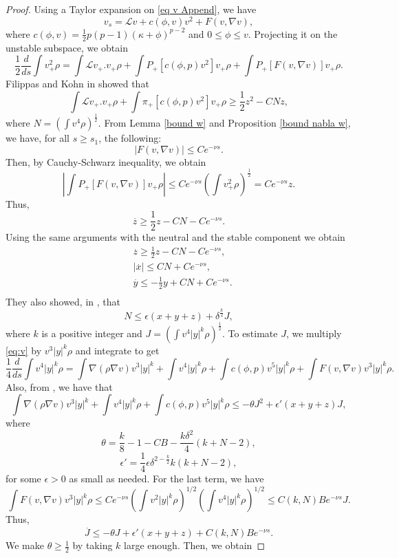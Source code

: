 \documentclass[11pt,a4paper]{article}
\newcommand{\1}{\mathbbm{1}}
\numberwithin{equation}{section}
\theoremstyle{remark}
\begin{document}
\begin{proof}
Using a Taylor expansion on \eqref{eq v Append}, we have
\begin{equation}\label{eq:v}
v_s=\mathcal{L}v+c(\phi,v)v^2+F(v,\nabla v),
\end{equation}
where $c(\phi,v)=\frac{1}{2}p(p-1)(\kappa+\phi)^{p-2}$ and $0\leq \phi \leq v$. 
Projecting it on the unstable subspace, we obtain 
$$\frac{1}{2}\frac{d}{d s}\int v^2_+\rho=\int \mathcal{L}v_+ .v_+\rho+\int P_+[c(\phi,p)v^2]v_+\rho+\int P_+[F(v,\nabla v)]v_+\rho.$$
Filippas and Kohn in \cite[pages 842 and 843]{FK1992} showed that 
$$\int \mathcal{L}v_+ .v_+\rho+\int \pi_+[c(\phi,p)v^2]v_+\rho\geq \frac{1}{2}z^2-CNz,$$
where $N=(\int v^4\rho)^{\frac{1}{2}}$. From Lemma \ref{bound w} and Proposition \ref{bound nabla w}, we have, for all $s\geq s_1$, the following:
$$|F(v,\nabla v)|\leq Ce^{-\nu s}.$$
Then, by Cauchy-Schwarz inequality, we obtain 
$$\left|\int P_+[F(v,\nabla v)]v_+\rho\right|\leq Ce^{-\nu s}\left(\int v_+^2\rho\right)^{\frac{1}{2}}=Ce^{-\nu s} z.$$
Thus,
$$\overset{.}{z}\geq \frac{1}{2}z-CN-Ce^{-\nu s}.$$
Using the same arguments with the neutral and the stable component we obtain 
\begin{equation}\label{ineq xyz}
\begin{split}
&\overset{.}{z}\geq \frac{1}{2}z-CN-Ce^{-\nu s},\\
&|\overset{.}{x}|\leq CN+Ce^{-\nu s},\\
&\overset{.}{y}\leq -\frac{1}{2}y+CN+Ce^{-\nu s}.\\
\end{split}
\end{equation}
They also showed, in \cite[(4.10)]{FK1992}, that 
\begin{equation}\label{Control N}
N\leq \epsilon (x+y+z)+\delta^{\frac{k}{2}} J,
\end{equation}
where $k$ is a positive integer and $J=(\int v^4 |y|^k\rho )^{\frac{1}{2}}$.
To estimate $J$, we multiply \eqref{eq:v} by $v^3|y|^k\rho$ and integrate to get
\begin{equation}
\frac{1}{4}\frac{d}{ds}\int v^4|y|^k\rho=\int \nabla(\rho\nabla v)v^3|y|^k+\int v^4|y|^k\rho +\int c(\phi,p)v^5|y|^k \rho+\int F(v,\nabla v)v^3|y|^k\rho.
\end{equation}
Also, from \cite[(4.15)]{FK1992}, we have that
$$\int \nabla(\rho\nabla v)v^3|y|^k+\int v^4|y|^k\rho +\int c(\phi,p)v^5|y|^k \rho\leq -\theta J^2+\epsilon '(x+y+z)J,$$
where 
$$\theta =\frac{k}{8}-1-CB-\frac{k\delta^2}{4}(k+N-2),$$
$$\epsilon '=\frac{1}{4}\epsilon \delta^{2-\frac{k}{2}}k(k+N-2),$$
 for some $\epsilon>0$ as small as needed. For the last term, we have 
$$\int F(v,\nabla v)v^3 |y|^k\rho\leq Ce^{-\nu s}\left(\int v^2 |y|^k\rho\right)^{1/2}\left(\int v^4 |y|^k\rho\right)^{1/2}\leq  C(k,N)Be^{-\nu s}J.$$
Thus,
\begin{equation}
\overset{.}{J}\leq -\theta J+\epsilon ' (x+y+z)+C(k,N)Be^{-\nu s}.
\end{equation}
We make $\theta \geq \frac{1}{2}$ by taking $k$ large enough. Then, we obtain


\end{proof}
\end{document}

